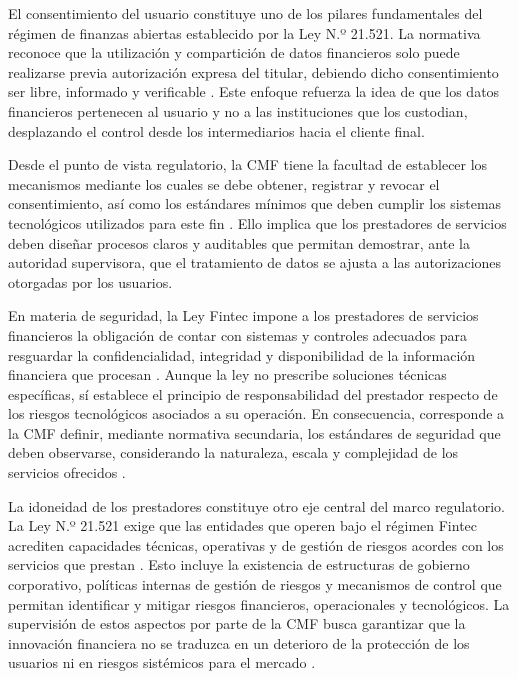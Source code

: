 \documentclass[
	spanish, %
	letterpaper, oneside
]{book}
\begin{document}
El consentimiento del usuario constituye uno de los pilares fundamentales del régimen de finanzas abiertas establecido por la Ley N.º 21.521. La normativa reconoce que la utilización y compartición de datos financieros solo puede realizarse previa autorización expresa del titular, debiendo dicho consentimiento ser libre, informado y verificable \cite{ley21521}. Este enfoque refuerza la idea de que los datos financieros pertenecen al usuario y no a las instituciones que los custodian, desplazando el control desde los intermediarios hacia el cliente final.

Desde el punto de vista regulatorio, la CMF tiene la facultad de establecer los mecanismos mediante los cuales se debe obtener, registrar y revocar el consentimiento, así como los estándares mínimos que deben cumplir los sistemas tecnológicos utilizados para este fin \cite{cmf_fintech}. Ello implica que los prestadores de servicios deben diseñar procesos claros y auditables que permitan demostrar, ante la autoridad supervisora, que el tratamiento de datos se ajusta a las autorizaciones otorgadas por los usuarios.

En materia de seguridad, la Ley Fintec impone a los prestadores de servicios financieros la obligación de contar con sistemas y controles adecuados para resguardar la confidencialidad, integridad y disponibilidad de la información financiera que procesan \cite{ley21521}. Aunque la ley no prescribe soluciones técnicas específicas, sí establece el principio de responsabilidad del prestador respecto de los riesgos tecnológicos asociados a su operación. En consecuencia, corresponde a la CMF definir, mediante normativa secundaria, los estándares de seguridad que deben observarse, considerando la naturaleza, escala y complejidad de los servicios ofrecidos \cite{cmf_fintech}.

La idoneidad de los prestadores constituye otro eje central del marco regulatorio. La Ley N.º 21.521 exige que las entidades que operen bajo el régimen Fintec acrediten capacidades técnicas, operativas y de gestión de riesgos acordes con los servicios que prestan \cite{ley21521}. Esto incluye la existencia de estructuras de gobierno corporativo, políticas internas de gestión de riesgos y mecanismos de control que permitan identificar y mitigar riesgos financieros, operacionales y tecnológicos. La supervisión de estos aspectos por parte de la CMF busca garantizar que la innovación financiera no se traduzca en un deterioro de la protección de los usuarios ni en riesgos sistémicos para el mercado \cite{cmf_fintech}.
\end{document}
